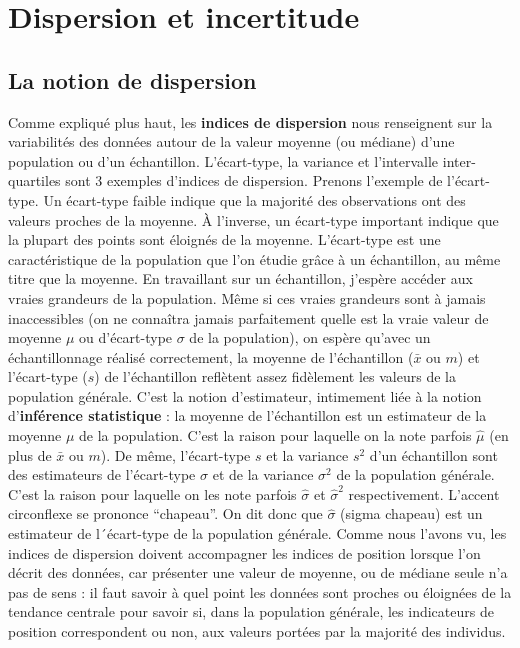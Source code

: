 \documentclass[
  a4paper,
  DIV=11,
  numbers=noendperiod,
  oneside]{scrreprt}
\begin{document}
\hypertarget{sec-disp}{%
\section{Dispersion et incertitude}\label{sec-disp}}

\hypertarget{la-notion-de-dispersion}{%
\subsection{La notion de dispersion}\label{la-notion-de-dispersion}}

Comme expliqué plus haut, les \textbf{indices de dispersion} nous
renseignent sur la variabilités des données autour de la valeur moyenne
(ou médiane) d'une population ou d'un échantillon. L'écart-type, la
variance et l'intervalle inter-quartiles sont 3 exemples d'indices de
dispersion. Prenons l'exemple de l'écart-type. Un écart-type faible
indique que la majorité des observations ont des valeurs proches de la
moyenne. À l'inverse, un écart-type important indique que la plupart des
points sont éloignés de la moyenne. L'écart-type est une caractéristique
de la population que l'on étudie grâce à un échantillon, au même titre
que la moyenne. En travaillant sur un échantillon, j'espère accéder aux
vraies grandeurs de la population. Même si ces vraies grandeurs sont à
jamais inaccessibles (on ne connaîtra jamais parfaitement quelle est la
vraie valeur de moyenne \(\mu\) ou d'écart-type \(\sigma\) de la
population), on espère qu'avec un échantillonnage réalisé correctement,
la moyenne de l'échantillon (\(\bar{x}\) ou \(m\)) et l'écart-type
(\(s\)) de l'échantillon reflètent assez fidèlement les valeurs de la
population générale. C'est la notion d'estimateur, intimement liée à la
notion d'\textbf{inférence statistique} : la moyenne de l'échantillon
est un estimateur de la moyenne \(\mu\) de la population. C'est la
raison pour laquelle on la note parfois \(\hat{\mu}\) (en plus de
\(\bar{x}\) ou \(m\)). De même, l'écart-type \(s\) et la variance
\(s^2\) d'un échantillon sont des estimateurs de l'écart-type \(\sigma\)
et de la variance \(\sigma^2\) de la population générale. C'est la
raison pour laquelle on les note parfois \(\hat{\sigma}\) et
\(\hat{\sigma}^2\) respectivement. L'accent circonflexe se prononce
``chapeau''. On dit donc que \(\hat{\sigma}\) (sigma chapeau) est un
estimateur de l´écart-type de la population générale. Comme nous l'avons
vu, les indices de dispersion doivent accompagner les indices de
position lorsque l'on décrit des données, car présenter une valeur de
moyenne, ou de médiane seule n'a pas de sens : il faut savoir à quel
point les données sont proches ou éloignées de la tendance centrale pour
savoir si, dans la population générale, les indicateurs de position
correspondent ou non, aux valeurs portées par la majorité des individus.
\end{document}
